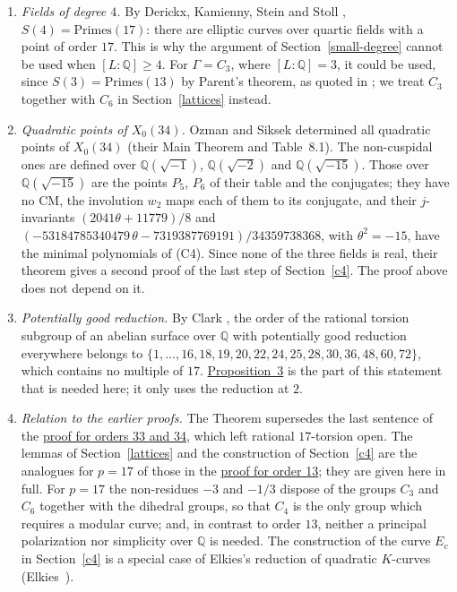 \documentclass[11pt]{article}
\newcommand{\Q}{\mathbb Q}
\begin{document}
\begin{enumerate}
\item \emph{Fields of degree \(4\).} By Derickx, Kamienny, Stein and Stoll
\cite[Theorem~1.2]{DKSS}, \(S(4)=\mathrm{Primes}(17)\): there are elliptic curves over quartic
fields with a point of order \(17\). This is why the argument of Section~\ref{small-degree}
cannot be used when \([L:\Q]\ge4\). For \(\Gamma=C_3\), where \([L:\Q]=3\), it could be used,
since \(S(3)=\mathrm{Primes}(13)\) by Parent's theorem, as quoted in \cite[Section~1]{DKSS}; we
treat \(C_3\) together with \(C_6\) in Section~\ref{lattices} instead.

\item \emph{Quadratic points of \(X_0(34)\).} Ozman and Siksek \cite{OS} determined all
quadratic points of \(X_0(34)\) (their Main Theorem and Table~8.1). The non-cuspidal ones are
defined over \(\Q(\sqrt{-1})\), \(\Q(\sqrt{-2})\) and \(\Q(\sqrt{-15})\). Those over
\(\Q(\sqrt{-15})\) are the points \(P_5\), \(P_6\) of their table and the conjugates; they have
no CM, the involution \(w_2\) maps each of them to its conjugate, and their \(j\)-invariants
\((2041\theta+11779)/8\) and \((-53184785340479\,\theta-7319387769191)/34359738368\), with
\(\theta^2=-15\), have the minimal polynomials of (C4). Since none of the three fields is real,
their theorem gives a second proof of the last step of Section~\ref{c4}. The proof above does
not depend on it.

\item \emph{Potentially good reduction.} By Clark \cite{Cla}, the order of the rational torsion
subgroup of an abelian surface over \(\Q\) with potentially good reduction everywhere belongs to
\(\{1,\ldots,16,18,19,20,22,24,25,28,30,36,48,60,72\}\), which contains no multiple of \(17\).
\hyperref[prop-good]{Proposition~3} is the part of this statement that is needed here; it only
uses the reduction at \(2\).

\item \emph{Relation to the earlier proofs.} The Theorem supersedes the last sentence of the
\href{https://genus-2-torsion.github.io/proofs/geometric-33-34-obstruction.html}{proof for orders
33 and 34}, which left rational \(17\)-torsion open. The lemmas of Section~\ref{lattices} and the
construction of Section~\ref{c4} are the analogues for \(p=17\) of those in the
\href{https://genus-2-torsion.github.io/proofs/qsimple-13-obstruction.html}{proof for order 13};
they are given here in full. For \(p=17\) the non-residues \(-3\) and \(-1/3\) dispose of the
groups \(C_3\) and \(C_6\) together with the dihedral groups, so that \(C_4\) is the only group
which requires a modular curve; and, in contrast to order \(13\), neither a principal
polarization nor simplicity over \(\Q\) is needed. The construction of the curve \(E_c\) in
Section~\ref{c4} is a special case of Elkies's reduction of quadratic \(K\)-curves
(Elkies~\cite{Elk}).
\end{enumerate}
\end{document}
